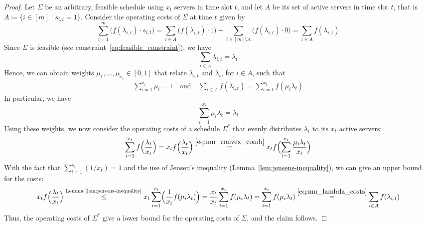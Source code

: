 \begin{proof}
Let $\Sigma$ be an arbitrary, feasible schedule using $x_t$ servers in time slot $t$, and let $A$ be its set of active servers in time slot $t$, that is $A\coloneqq\{i\in[m]\mid s_{i,t}=1\}$.
Consider the operating costs of $\Sigma$ at time $t$ given by
\begin{equation*}
	\sum\limits_{i=1}^{m}\bigl(f(\lambda_{i,t})\cdot s_{i,t}\bigr)=\sum\limits_{i\in A}\bigl(f(\lambda_{i,t})\cdot1\bigr)+\sum\limits_{i\in [m]\setminus A}\bigl(f(\lambda_{i,t})\cdot0\bigr)=\sum\limits_{i\in A}f(\lambda_{i,t})
\end{equation*}
Since $\Sigma$ is feasible (see constraint~\eqref{eq:feasible_constraint}), we have 
\begin{equation*}
	\sum\limits_{i\in A}\lambda_{i,t}=\lambda_t
\end{equation*}
Hence, we can obtain weights $\mu_1,\dotsc,\mu_{x_t}\in[0,1]$ that relate $\lambda_{i,t}$ and $\lambda_t$, for $i\in A$, such that
\begin{align}
	\sum\limits_{i=1}^{x_t}\mu_i=1\quad\text{and}\quad \sum\limits_{i\in A}f(\lambda_{i,t})=\sum\limits_{i=1}^{x_t}f(\mu_i\lambda_t)\label{eq:mu_lambda_costs}
\end{align}
In particular, we have 
\begin{equation}
	\sum_{i=1}^{x_t}\mu_i\lambda_t=\lambda_t\label{eq:mu_convex_comb}
\end{equation}
Using these weights, we now consider the operating costs of a schedule $\Sigma^*$ that evenly distributes $\lambda_t$ to its $x_t$ active servers:
\begin{align*}
	\sum\limits_{i=1}^{x_t}f\Bigl(\frac{\lambda_t}{x_t}\Bigr)=x_tf\Bigl(\frac{\lambda_t}{x_t}\Bigr)\stackrel{\eqref{eq:mu_convex_comb}}{=}x_tf\Bigl(\sum\limits_{i=1}^{x_t}{\frac{\mu_i\lambda_t}{x_t}}\Bigr)
\end{align*}
With the fact that $\sum_{i=1}^{x_t}(1/x_t)=1$ and the use of Jensen's inequality (Lemma~\ref{lem:jensens-inequality}), we can give an upper bound for the costs:
\begin{align*}
	x_tf\Bigl(\frac{\lambda_t}{x_t}\Bigr)\stackrel{\text{Lemma~\ref{lem:jensens-inequality}}}{\le}x_t\sum\limits_{i=1}^{x_t}\Bigl(\frac{1}{x_t}f(\mu_i\lambda_t)\Bigr)=\frac{x_t}{x_t}\sum\limits_{i=1}^{x_t}f(\mu_i\lambda_t)=\sum\limits_{i=1}^{x_t}f(\mu_i\lambda_t)\stackrel{\eqref{eq:mu_lambda_costs}}{=}\sum\limits_{i\in A}f(\lambda_{i,t})
\end{align*}
Thus, the operating costs of $\Sigma^*$ give a lower bound for the operating costs of $\Sigma$, and the claim follows.
\end{proof}
